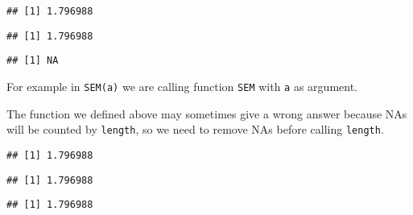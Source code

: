\documentclass[paper=a4,headsepline,BCOR=12mm,twoside,open=right,%
titlepage,headings=small,fontsize=10pt,index=totoc,bibliography=totoc,%
captions=tableheading,captions=nooneline]{scrbook}\usepackage{knitr}
\begin{document}
\begin{knitrout}\footnotesize
{}\color{fgcolor}\begin{kframe}
\begin{alltt}
 \hlkwb{<-} \hlstd{(}\hlstd{)\{}\hlstd{(}\hlopt{/}
 \hlkwb{<-} \hlstd{(}\hlstd{,} \hlstd{,} \hlstd{,} \hlopt{-}\hlstd{)}
 \hlkwb{<-}  \hlstd{)}
\hlstd{(}
\end{alltt}
\begin{verbatim}
## [1] 1.796988
\end{verbatim}
\begin{alltt}
\end{alltt}
\begin{verbatim}
## [1] 1.796988
\end{verbatim}
\begin{alltt}
\end{alltt}
\begin{verbatim}
## [1] NA
\end{verbatim}
\end{kframe}
\end{knitrout}

For example in \texttt{SEM(a)} we are calling function \texttt{SEM} with \texttt{a} as argument.

The function we defined above may sometimes give a wrong answer because NAs will be counted by \texttt{length}, so we need to remove NAs before calling \texttt{length}.

\begin{knitrout}\footnotesize
{}\color{fgcolor}\begin{kframe}
\begin{alltt}
 \hlkwb{<-} \hlstd{(}\hlstd{) \{}
 \hlstd{(} \hlstd{=}\hlstd{)}\hlopt{/}\hlstd{(}
\hlstd{\}}
 \hlkwb{<-} \hlstd{(}\hlstd{,} \hlstd{,} \hlstd{,} \hlopt{-}\hlstd{)}
 \hlkwb{<-}  \hlstd{)}
\hlstd{(}
\end{alltt}
\begin{verbatim}
## [1] 1.796988
\end{verbatim}
\begin{alltt}
\end{alltt}
\begin{verbatim}
## [1] 1.796988
\end{verbatim}
\begin{alltt}
\end{alltt}
\begin{verbatim}
## [1] 1.796988
\end{verbatim}
\end{kframe}
\end{knitrout}
\end{document}
